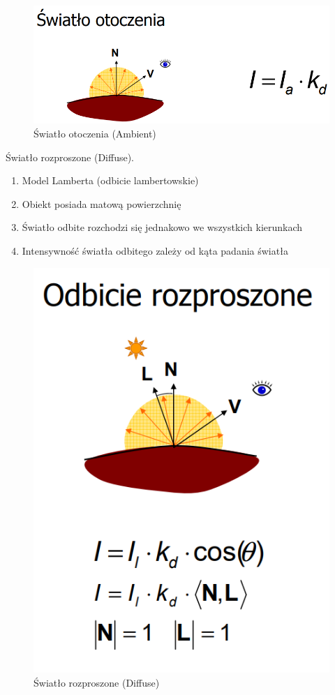 \documentclass[12pt]{article}
\begin{document}
\begin{figure}[H]
	\centering
	\includegraphics[scale=0.5]{Pictures/ambient.png}
	\caption{Światło otoczenia (Ambient)}
\end{figure}

Światło rozproszone (Diffuse).
\begin{enumerate}
\item Model Lamberta (odbicie lambertowskie)
\item Obiekt posiada matową powierzchnię
\item Światło odbite rozchodzi się jednakowo we wszystkich kierunkach
\item Intensywność światła odbitego zależy od kąta padania światła
\end{enumerate}

\begin{figure}[H]
	\centering
	\includegraphics[scale=0.5]{Pictures/diffuse.png}
	\caption{Światło rozproszone (Diffuse)}
\end{figure}
\end{document}
